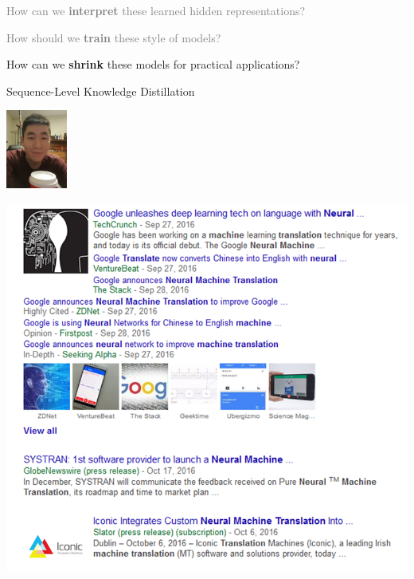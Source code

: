 \documentclass{beamer}
\let\tempone\itemize
\let\temptwo\enditemize
\renewenvironment{itemize}{\tempone\addtolength{\itemsep}{0.5\baselineskip}}{\temptwo}
\newcommand{\air}{\vspace{0.25cm}}
\newcommand{\Cite}[1]{{\footnotesize \citep{#1}}}
\begin{document}
\begin{frame}
  \centerline{}
  \air 
  \air

  \begin{itemize}
  \item \textcolor{gray}{How can we \textbf{interpret} these learned hidden representations? \Cite{Strobelt2016}}
    \air 
  \item  \textcolor{gray}{ How should we \textbf{train} these style of models? \Cite{Wiseman2016a}}
    \air 
  \item How can we \textbf{shrink} these models for practical applications?

    \air 
    \begin{center}
      \alert{Sequence-Level Knowledge Distillation }

      \Cite{Kim2016a} 

      \includegraphics[width=2cm]{yoon}
    \end{center}

  \end{itemize}
\end{frame}


\begin{frame}
\center
\includegraphics[scale=0.5]{nmt-news} \\
\end{frame}
\end{document}
